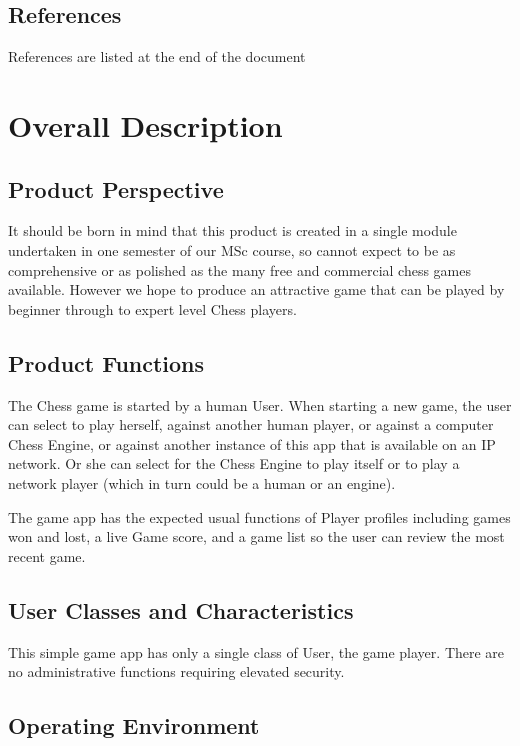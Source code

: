 \documentclass[a4paper,10pt]{article}
\begin{document}
\subsection{References}
References are listed at the end of the document


\section{Overall Description}
\subsection{Product Perspective}
It should be born in mind that this product is created in a single module undertaken in one semester of our MSc course, so cannot expect to be as comprehensive or as polished as the many free and commercial chess games available. However we hope to produce an attractive game that can be played by beginner through to expert level Chess players.

\subsection{Product Functions}

The Chess game is started by a human User. When starting a new game, the user can select to play herself, against another human player, or against a computer Chess Engine, or against another instance of this app that is available on an IP network. Or she can select for the Chess Engine to play itself or to play a network player (which in turn could be a human or an engine). 

The game app has the expected usual functions of Player profiles including games won and lost, a live Game score, and a game list so the user can review the most recent game. 

\subsection{User Classes and Characteristics}
This simple game app has only a single class of User, the game player. There are no administrative functions requiring elevated security. 

\subsection{Operating Environment}
\end{document}
